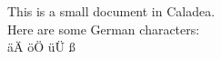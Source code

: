 \documentclass{article}
\begin{document}
This is a small document in Caladea.
\\
Here are some German characters:
\\
äÄ öÖ üÜ ß
\end{document}
